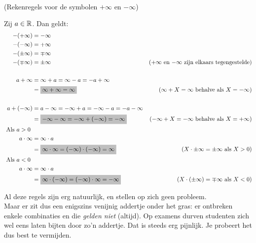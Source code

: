 \documentclass{ximera}
\begin{document}
\begin{proposition} (Rekenregels voor de symbolen $+\infty$ en $-\infty$)

	Zij $a\in\mathbb{R}$. Dan geldt:	
	\begin{align*}
	-(+\infty) & = -\infty \\
	-(-\infty) & = +\infty  \\
	-(\pm\infty) &= \mp\infty \\
	-(\mp\infty) &= \pm\infty & \text{($+\infty$ en $-\infty$ zijn elkaars tegengestelde)}\\ 
	\\
	a+\infty & = \infty+a = \infty - a = -a +\infty \\
	& = \important{\infty + \infty = \infty} & \text{($\infty + X =\infty$ behalve als $X=-\infty$)} \\
	\\
	a+(-\infty) & = a-\infty = -\infty+a =-\infty - a = -a - \infty \\
	& = \important{-\infty - \infty = -\infty+(-\infty) = -\infty} & \text{($-\infty+X=-\infty$ behalve als $X=+\infty$)} \\
	\mbox{ Als $a>0$ }\\%
	a\cdot\infty & = \infty\cdot a \\
	& = \important{\infty \cdot \infty = (-\infty) \cdot (-\infty) = \infty} & \text{($X\cdot\pm\infty=\pm\infty$ als $X>0$)} \\
	\mbox{Als $a<0$ } \\%
		a\cdot\infty & = \infty\cdot a \\
	& = \important{\infty \cdot (-\infty) = (-\infty)\cdot\infty = -\infty} & \text{($X\cdot(\pm\infty) = \mp\infty$ als $X<0$)} \\
	\end{align*}	
\end{proposition}  

Al deze regels zijn erg natuurlijk, en stellen op zich geen probleem. \\
Maar er zit dus een enigszins venijnig addertje onder het gras: er ontbreken enkele combinaties en die \textit{gelden niet} (altijd). Op examens durven studenten zich wel eens laten bijten door zo'n addertje. Dat is steeds erg pijnlijk. Je probeert het dus best te vermijden.
\end{document}
